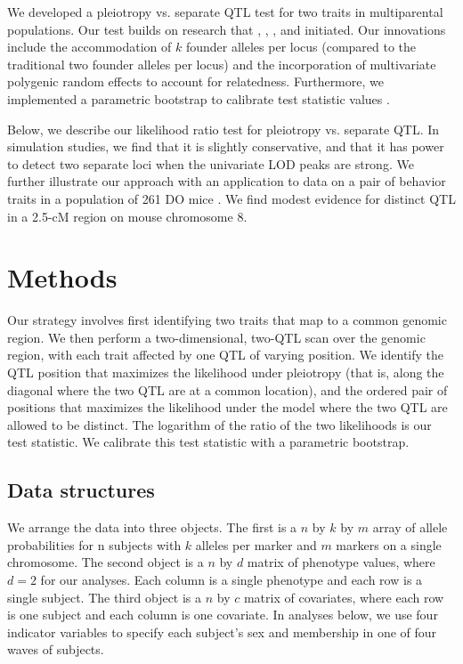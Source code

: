 \documentclass[12pt,twoside, lineno]{gsajnl}
\begin{document}
We developed a pleiotropy vs. separate QTL test for two traits in
multiparental populations. Our test builds on research that
\citet{jiang1995multiple}, \citet{knott2000multitrait},
\citet{tian2016dissection}, and \citet{zhou2014efficient} initiated.
Our innovations include the accommodation of $k$ founder alleles per
locus (compared to the traditional two founder alleles per locus) and
the incorporation of multivariate polygenic random effects to account
for relatedness. Furthermore, we implemented a parametric bootstrap to
calibrate test statistic values \citep{efron1979,tian2016dissection}.

Below, we describe our likelihood ratio test for pleiotropy vs.
separate QTL. In simulation studies, we find that it is slightly
conservative, and that it has power to detect two separate loci when
the univariate LOD peaks are strong. We further illustrate our
approach with an application to data on a pair of behavior traits in
a population of 261 DO mice \citep{logan2013high,recla2014precise}.
We find modest evidence for distinct QTL in a 2.5-cM region on mouse
chromosome 8.


\section{Methods}
\label{sec:materials:methods}

Our strategy involves first identifying two traits that map to a common
genomic region. We then perform a two-dimensional, two-QTL scan over
the genomic region, with each trait affected by one QTL of varying
position. We identify the QTL position that maximizes the likelihood
under pleiotropy (that is, along the diagonal where the two QTL are at
a common location), and the ordered pair of positions that maximizes
the likelihood under the model where the two QTL are allowed to be
distinct. The logarithm of the ratio of the two likelihoods is our
test statistic. We calibrate this test statistic with a parametric
bootstrap.

\subsection{Data structures}

We arrange the data into three objects. The first is a $n$ by $k$ by
$m$ array of allele probabilities for n subjects with $k$ alleles per
marker and $m$ markers on a single chromosome. The second object is a
$n$ by $d$ matrix of phenotype values, where $d = 2$ for our analyses.
Each column is a single phenotype and each row is a single subject.
The third object is a $n$ by $c$ matrix of covariates, where each row
is one subject and each column is one covariate. In analyses below, we
use four indicator variables to specify each subject's sex and
membership in one of four waves of subjects.
\end{document}

